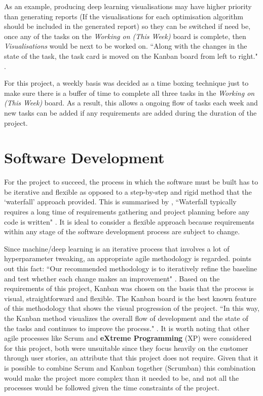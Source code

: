 \documentclass[report, 11pt, oneside]{dissertation}
\begin{document}
 As an example, producing deep learning visualisations may have higher priority than generating reports (If the visualisations for each optimisation algorithm should be included in the generated report) so they can be switched if need be, once any of the tasks on the \textit{Working on (This Week)} board is complete, then \textit{Visualisations} would be next to be worked on. ``Along with the changes in the state of the task, the task card is moved on the Kanban board from left to right." \citep{Nakazawa:2016ip}.

For this project, a weekly basis was decided as a time boxing technique just to make sure there is a buffer of time to complete all three tasks in the \textit{Working on (This Week)} board. As a result, this allows a ongoing flow of tasks each week and new tasks can be added if any requirements are added during the duration of the project.

\section{Software Development}

For the project to succeed, the process in which the software must be built has to be iterative and flexible as opposed to a step-by-step and rigid method that the `waterfall' approach provided. This is summarised by \citep{Shaydulin:2017ty}, ``Waterfall typically requires a long time of requirements gathering and project planning before any code is written" \citep[5]{Shaydulin:2017ty}. It is ideal to consider a flexible approach because requirements within any stage of the software development process are subject to change.

Since machine/deep learning is an iterative process that involves a lot of hyperparameter tweaking, an appropriate agile methodology is regarded. \citep{Goodfellow-et-al-2016} points out this fact: ``Our recommended methodology is to iteratively refine the baseline and test whether each change makes an improvement" \citep[429]{Goodfellow-et-al-2016}. Based on the requirements of this project, Kanban was chosen on the basis that the process is visual, straightforward and flexible. The Kanban board is the best known feature of this methodology that shows the visual progression of the project. ``In this way, the Kanban method visualizes the overall flow of development and the state of the tasks and continues to improve the process." \citep{Nakazawa:2016ip}. It is worth noting that other agile processes like Scrum and \textbf{eXtreme Programming} (XP) were considered for this project, both were unsuitable since they focus heavily on the customer through user stories, an attribute that this project does not require. Given that it is possible to combine Scrum and Kanban together (Scrumban) this combination would make the project more complex than it needed to be, and not all the processes would be followed given the time constraints of the project.
\end{document}
